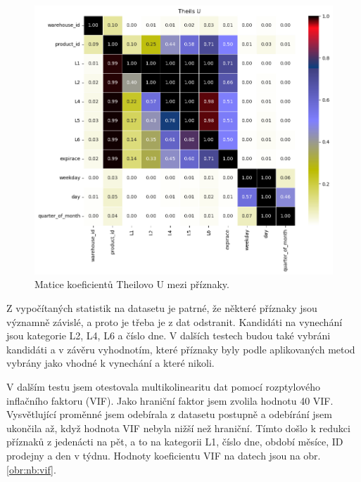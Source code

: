 \begin{figure}[hbtp!]
    \centering
    \includegraphics[width=.8\textwidth]{obrazky/zntb/theils_u.png}
    \caption{Matice koeficientů Theilovo U mezi příznaky.}
    \label{obr:nb:thiels}
\end{figure}

Z vypočítaných statistik na datasetu je patrné, že některé příznaky jsou významně závislé, a proto je třeba je z dat odstranit. Kandidáti na vynechání jsou kategorie L2, L4, L6 a číslo dne. V dalších testech budou také vybráni kandidáti a v závěru vyhodnotím, které příznaky byly podle aplikovaných metod vybrány jako vhodné k vynechání a které nikoli.

V dalším testu jsem otestovala multikolinearitu dat pomocí rozptylového inflačního faktoru (VIF). Jako hraniční faktor jsem zvolila hodnotu 40 VIF. Vysvětlující proměnné jsem odebírala z datasetu postupně a odebírání jsem ukončila až, když hodnota VIF nebyla nižší než hraniční.
Tímto došlo k redukci příznaků z jedenácti na pět, a to na kategorii L1, číslo dne, období měsíce, ID prodejny a den v týdnu. Hodnoty koeficientu VIF na datech jsou na obr. \ref*{obr:nb:vif}. 

